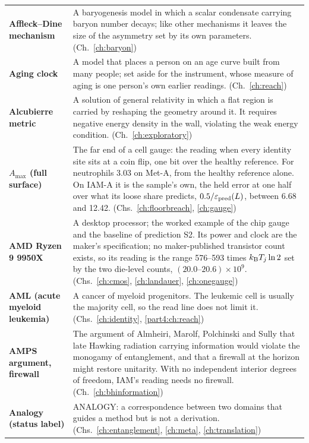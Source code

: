 {\begin{longtable}{@{}>{\raggedright\arraybackslash}p{}>{\raggedright\arraybackslash}p{}@{}}
\iamrowrule
\textbf{Affleck--Dine mechanism} & A baryogenesis model in which a scalar condensate carrying baryon number decays; like other mechanisms it leaves the size of the asymmetry set by its own parameters. {\footnotesize(Ch.~\ref{ch:baryon})}\\[1pt]
\iamrowrule
\textbf{Aging clock} & A model that places a person on an age curve built from many people; set aside for the instrument, whose measure of aging is one person's own earlier readings. {\footnotesize(Ch.~\ref{ch:reach})}\\[1pt]
\iamrowrule
\textbf{Alcubierre metric} & A solution of general relativity in which a flat region is carried by reshaping the geometry around it. It requires negative energy density in the wall, violating the weak energy condition. {\footnotesize(Ch.~\ref{ch:exploratory})}\\[1pt]
\iamrowrule
\textbf{$A_{\max}$ (full surface)} & The far end of a cell gauge: the reading when every identity site sits at a coin flip, one bit over the healthy reference. For neutrophils 3.03 on Met-A, from the healthy reference alone. On IAM-A it is the sample's own, the held error at one half over what its loose share predicts, $0.5/\varepsilon_{\rm pred}(L)$, between 6.68 and 12.42. {\footnotesize(Chs.~\ref{ch:floorbreach}, \ref{ch:gauge})}\\[1pt]
\iamrowrule
\textbf{AMD Ryzen 9 9950X} & A desktop processor; the worked example of the chip gauge and the baseline of prediction S2. Its power and clock are the maker's specification; no maker-published transistor count exists, so its reading is the range 576--593 times $k_{\mathrm B} T_j\ln2$ set by the two die-level counts, $(20.0\text{--}20.6)\times10^9$. {\footnotesize(Chs.~\ref{ch:cmos}, \ref{ch:landauer}, \ref{ch:onegauge})}\\[1pt]
\iamrowrule
\textbf{AML (acute myeloid leukemia)} & A cancer of myeloid progenitors. The leukemic cell is usually the majority cell, so the read line does not limit it. {\footnotesize(Chs.~\ref{ch:identity}, \ref{part4:ch:reach})}\\[1pt]
\iamrowrule
\textbf{AMPS argument, firewall} & The argument of Almheiri, Marolf, Polchinski and Sully that late Hawking radiation carrying information would violate the monogamy of entanglement, and that a firewall at the horizon might restore unitarity. With no independent interior degrees of freedom, IAM's reading needs no firewall. {\footnotesize(Ch.~\ref{ch:bhinformation})}\\[1pt]
\iamrowrule
\textbf{Analogy (status label)} & ANALOGY: a correspondence between two domains that guides a method but is not a derivation. {\footnotesize(Chs.~\ref{ch:entanglement}, \ref{ch:meta}, \ref{ch:translation})}\\[1pt]

\end{longtable}}
